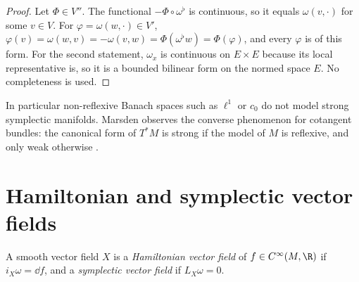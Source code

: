 \begin{proof}
  \leanok
  Let $\Phi \in V''$. The functional $-\Phi \circ \omega^\flat$ is continuous, so it equals
  $\omega(v, \cdot)$ for some $v \in V$. For $\varphi = \omega(w, \cdot) \in V'$,
  $\varphi(v) = \omega(w, v) = -\omega(v, w) = \Phi(\omega^\flat w) = \Phi(\varphi)$, and every
  $\varphi$ is of this form. For the second statement, $\omega_x$ is continuous on $E \times E$
  because its local representative is, so it is a bounded bilinear form on the normed space $E$.
  No completeness is used.
\end{proof}

In particular non-reflexive Banach spaces such as $\ell^1$ or $c_0$ do not model strong
symplectic manifolds. Marsden observes the converse phenomenon for cotangent bundles: the
canonical form of $T^*M$ is strong if the model of $M$ is reflexive, and only weak otherwise
\cite[p.~590]{Mar72}.

\section{Hamiltonian and symplectic vector fields}

\begin{definition}
  \label{def:hamiltonian}
  \leanok
  A smooth vector field $X$ is a \emph{Hamiltonian vector field} of $f \in C^\infty(M, \R)$ if
  $i_X \omega = \dd f$, and a \emph{symplectic vector field} if $L_X \omega = 0$.
\end{definition}

